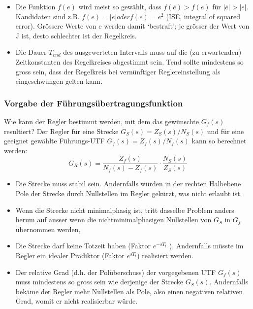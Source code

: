 \begin{itemize}
\item Die Funktion $f(e)$ wird meist so gewählt, dass $f(\overline{e}) > f(e)$ für $|\overline{e}| > |e|$.
Kandidaten sind z.B. $f(e) = |e| oder f(e) = e^2$ (ISE, integral of squared
error). Grössere Werte von e werden damit ‘bestraft’; je grösser der Wert von
J ist, desto schlechter ist der Regelkreis.
\item Die Dauer $T_{end}$ des ausgewerteten Intervalls muss auf die (zu erwartenden)
Zeitkonstanten des Regelkreises abgestimmt sein. Tend sollte mindestens so
gross sein, dass der Regelkreis bei vernünftiger Reglereinstellung als eingeschwungen
gelten kann.
\end{itemize}

\subsubsection{Vorgabe der Führungsübertragungsfunktion}

Wie kann der Regler bestimmt werden, mit dem das gewünschte $G_f(s)$ resultiert?
Der Regler für eine Strecke $G_S(s) = Z_S(s)/N_S(s)$ und für eine geeignet gewählte
Führungs-UTF $G_f(s) = Z_f(s)/N_f(s)$ kann so berechnet werden:
\begin{equation}
\boxed{G_R(s)=\frac{Z_f(s)}{N_f(s)-Z_f(s)}\cdot\frac{N_S(s)}{Z_S(s)}}
\end{equation}
\begin{itemize}
\item  Die Strecke muss stabil sein. Andernfalls würden in der rechten Halbebene
Pole der Strecke durch Nullstellen im Regler gekürzt, was nicht erlaubt ist.
\item  Wenn die Strecke nicht minimalphasig ist, tritt dasselbe Problem anders herum
auf ausser wenn die nichtminimalphasigen Nullstellen von $G_S$ in $G_f$
übernommen werden, 
\item  Die Strecke darf keine Totzeit haben (Faktor $e^{-sT_t}$ ). Andernfalls müsste im
Regler ein idealer Prädiktor (Faktor $e^{sT_t}$) realisiert werden.
\item  Der relative Grad (d.h. der Polüberschuss) der vorgegebenen UTF $G_f (s)$ muss
mindestens so gross sein wie derjenige der Strecke $G_S(s)$. Andernfalls bekäme
der Regler mehr Nullstellen als Pole, also einen negativen relativen Grad, womit
er nicht realisierbar würde.
\end{itemize}
